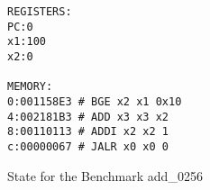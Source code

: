 \begin{figure}
    \centering
    \begin{verbatim}
REGISTERS:
PC:0
x1:100
x2:0

MEMORY:
0:001158E3 # BGE x2 x1 0x10
4:002181B3 # ADD x3 x3 x2
8:00110113 # ADDI x2 x2 1
c:00000067 # JALR x0 x0 0
    \end{verbatim}
    \caption[State of benchmark add\_0256]{State for the Benchmark
        add\_0256}\label{fig:bench_example}
\end{figure}